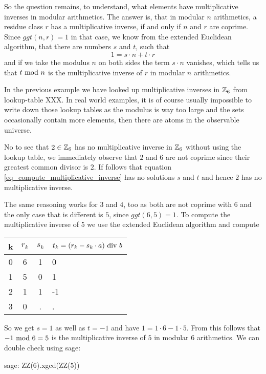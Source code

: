 So the question remains, to understand, what elements have multiplicative inverses in modular arithmetics. The answer is, that in modular $n$ arithmetics, a residue class $r$ has a multiplicative inverse, if and only if $n$ and $r$ are coprime. Since $ggt(n,r)=1$ in that case, we know from the extended Euclidean algorithm, that there are numbers $s$ and $t$, such that 
\begin{equation}
\label{eq_compute_multiplicative_inverse}
1 = s\cdot n + t\cdot r
\end{equation}
and if we take the modulus $n$ on both sides the term $s\cdot n$ vanishes, which tells us that $t \text{ mod } n$ is the multiplicative inverse of $r$ in modular $n$ arithmetics.
\begin{example} In the previous example we have looked up multiplicative inverses in $\mathbb{Z}_6$ from lookup-table XXX. In real world examples, it is of course usually impossible to write down those lookup tables as the modulus is way too large and the sets occasionally contain more elements, then there are atoms in the observable universe.

No to see that $2\in \mathbb{Z}_6$ has no multiplicative inverse in $\mathbb{Z}_6$ without using the lookup table, we immediately observe that $2$ and $6$ are not coprime since their greatest common divisor is $2$. If follows that equation \ref{eq_compute_multiplicative_inverse} has no solutions $s$ and $t$ and hence $2$ has no multiplicative inverse.

The same reasoning works for $3$ and $4$, too as both are not coprime with $6$ and the only case that is different is $5$, since $ggt(6,5)=1$. To compute the multiplicative inverse of $5$ we use the extended Euclidean algorithm and compute   
\begin{center}
  \begin{tabular}{c | c c l}
    k & $ r_k $ & $ s_k $ & $ t_k = (r_k-s_k \cdot a) \text{ div } b $ \\\hline
    0 & 6 & 1 & 0 \\
    1 & 5 & 0 & 1 \\
    2 & 1 & 1 & -1 \\
    3 & 0 & . & . \\
  \end{tabular}
\end{center}
So we get $s=1$ as well as $t=-1$ and have $1 = 1\cdot 6 -1\cdot 5$. From this follows that $-1 \text{ mod } 6=5$ is the multiplicative inverse of $5$ in modular $6$ arithmetics. We can double check using sage:
\begin{sagecommandline}
sage: ZZ(6).xgcd(ZZ(5))
\end{sagecommandline}
\end{example}
